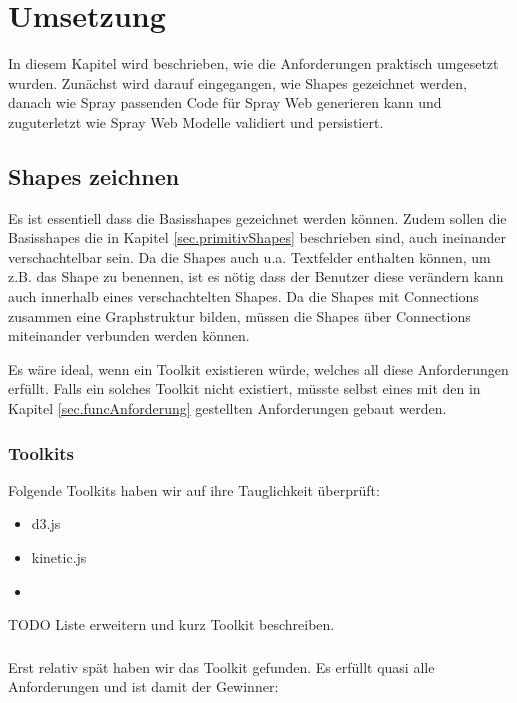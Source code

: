 \section{Umsetzung}

In diesem Kapitel wird beschrieben, wie die Anforderungen praktisch
umgesetzt wurden. Zunächst wird darauf eingegangen, wie Shapes gezeichnet
werden, danach wie Spray passenden Code für Spray Web generieren kann
und zuguterletzt wie Spray Web Modelle validiert und persistiert.

\subsection{Shapes zeichnen}

Es ist essentiell dass die Basisshapes gezeichnet werden können.
Zudem sollen die Basisshapes die in Kapitel \ref{sec.primitivShapes}
beschrieben sind, auch ineinander verschachtelbar sein.
Da die Shapes auch u.a. Textfelder enthalten können, um z.B. das Shape
zu benennen, ist es nötig dass der Benutzer diese verändern kann auch
innerhalb eines verschachtelten Shapes.
Da die Shapes mit Connections zusammen eine Graphstruktur bilden,
müssen die Shapes über Connections miteinander verbunden werden können.

Es wäre ideal, wenn ein Toolkit existieren würde, welches all diese
Anforderungen erfüllt. Falls ein solches Toolkit nicht existiert,
müsste selbst eines mit den in Kapitel \ref{sec.funcAnforderung}
gestellten Anforderungen gebaut werden.

\subsubsection{Toolkits}

Folgende Toolkits haben wir auf ihre Tauglichkeit überprüft:

\begin{itemize}
  \item d3.js
  \item kinetic.js
  \item \dd
\end{itemize}

TODO Liste erweitern und kurz Toolkit beschreiben.

\subsubsection{\dd}

Erst relativ spät haben wir das \dd Toolkit gefunden.
Es erfüllt quasi alle Anforderungen und ist damit der Gewinner:

